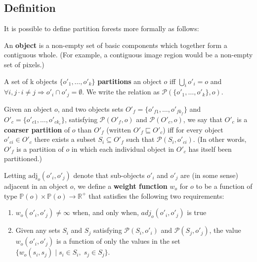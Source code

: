 
\subsection{Definition}
\label{sec:ipfs-definition}

It is possible to define partition forests more formally as follows:

\begin{definition}
An \textbf{object} is a non-empty set of basic components which together form a contiguous whole. (For example, a contiguous image region would be a non-empty set of pixels.)
\end{definition}

\begin{definition}
A set of k objects $\{o'_1,\ldots,o'_k\}$ \textbf{partitions} an object $o$ iff $\bigcup_i o'_i = o$ and $\forall i,j \cdot i \ne j \Rightarrow o'_i \cap o'_j = \emptyset$. We write the relation as $\mathcal{P}(\{o'_1,\ldots,o'_k\}, o)$.
\end{definition}

\begin{definition}
Given an object $o$, and two objects sets $O'_f = \{o'_{f1},\ldots,o'_{fk_f}\}$ and $O'_c = \{o'_{c1},\ldots,o'_{ck_c}\}$, satisfying $\mathcal{P}(O'_f,o)$ and $\mathcal{P}(O'_c,o)$, we say that $O'_c$ is a \textbf{coarser partition} of $o$ than $O'_f$ (written $O'_f \sqsubseteq O'_c$) iff for every object $o'_{ci} \in O'_c$ there exists a subset $S_i \subseteq O'_f$ such that $\mathcal{P}(S_i,o'_{ci})$. (In other words, $O'_f$ is a partition of $o$ in which each individual object in $O'_c$ has itself been partitioned.)
\end{definition}

\begin{definition}
Letting $\mbox{adj}_o(o'_i, o'_j)$ denote that sub-objects $o'_i$ and $o'_j$ are (in some sense) adjacent in an object $o$, we define a \textbf{weight function} $w_o$ for $o$ to be a function of type $\mathbb{P}(o) \times \mathbb{P}(o) \to \mathbb{R}^+$ that satisfies the following two requirements:
%
\begin{enumerate}

\item $w_o(o'_i, o'_j) \ne \infty$ when, and only when, $adj_o(o'_i, o'_j)$ is true

\item Given any sets $S_i$ and $S_j$ satisfying $\mathcal{P}(S_i,o'_i)$ and $\mathcal{P}(S_j,o'_j)$, the value $w_o(o'_i, o'_j)$ is a function of only the values in the set $\{w_o(s_i, s_j) \; | \; s_i \in S_i, \; s_j \in S_j\}$.

\end{enumerate}

\end{definition}

